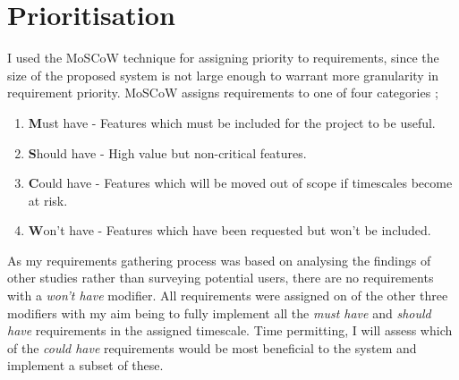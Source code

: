 \section{Prioritisation}
I used the MoSCoW technique for assigning priority to requirements, since the size of the proposed system is not large enough to warrant more granularity in requirement priority. MoSCoW assigns requirements to one of four categories \citep{PrioritizationUsingMoscow};
\begin{enumerate}
	\item \textbf{M}ust have - Features which must be included for the project to be useful.
	\item \textbf{S}hould have - High value but non-critical features.
	\item \textbf{C}ould have - Features which will be moved out of scope if timescales become at risk.
	\item \textbf{W}on't have - Features which have been requested but won't be included. 
\end{enumerate}
As my requirements gathering process was based on analysing the findings of other studies rather than surveying potential users, there are no requirements with a \textit{won't have} modifier. All requirements were assigned on of the other three modifiers with my aim being to fully implement all the \textit{must have} and \textit{should have} requirements in the assigned timescale. Time permitting, I will assess which of the \textit{could have} requirements would be most beneficial to the system and implement a subset of these.
